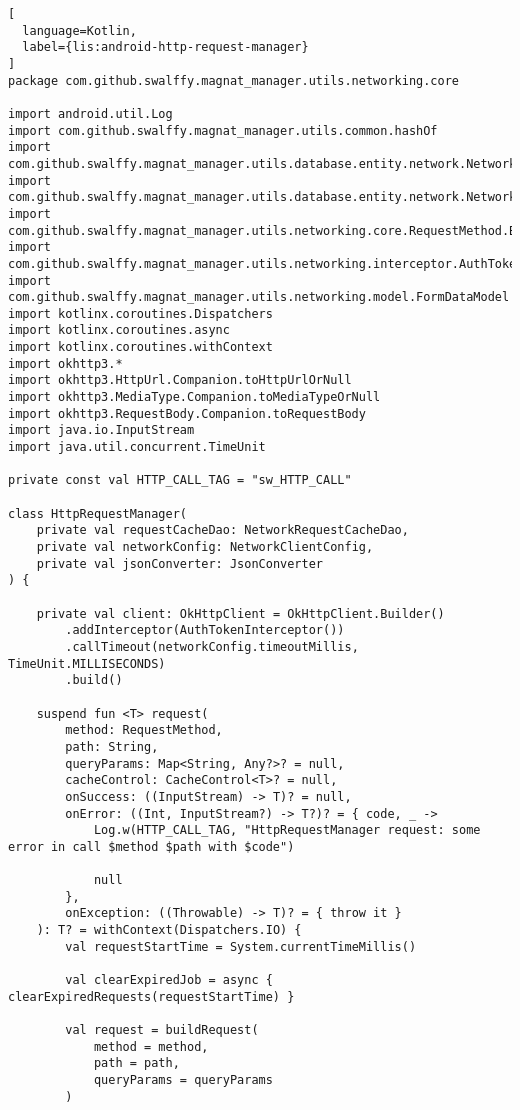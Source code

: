 \begin{lstlisting}[
  language=Kotlin,
  label={lis:android-http-request-manager}
]
package com.github.swalffy.magnat_manager.utils.networking.core

import android.util.Log
import com.github.swalffy.magnat_manager.utils.common.hashOf
import com.github.swalffy.magnat_manager.utils.database.entity.network.NetworkRequestCacheDao
import com.github.swalffy.magnat_manager.utils.database.entity.network.NetworkRequestCacheRecord
import com.github.swalffy.magnat_manager.utils.networking.core.RequestMethod.BodyType
import com.github.swalffy.magnat_manager.utils.networking.interceptor.AuthTokenInterceptor
import com.github.swalffy.magnat_manager.utils.networking.model.FormDataModel
import kotlinx.coroutines.Dispatchers
import kotlinx.coroutines.async
import kotlinx.coroutines.withContext
import okhttp3.*
import okhttp3.HttpUrl.Companion.toHttpUrlOrNull
import okhttp3.MediaType.Companion.toMediaTypeOrNull
import okhttp3.RequestBody.Companion.toRequestBody
import java.io.InputStream
import java.util.concurrent.TimeUnit

private const val HTTP_CALL_TAG = "sw_HTTP_CALL"

class HttpRequestManager(
    private val requestCacheDao: NetworkRequestCacheDao,
    private val networkConfig: NetworkClientConfig,
    private val jsonConverter: JsonConverter
) {

    private val client: OkHttpClient = OkHttpClient.Builder()
        .addInterceptor(AuthTokenInterceptor())
        .callTimeout(networkConfig.timeoutMillis, TimeUnit.MILLISECONDS)
        .build()

    suspend fun <T> request(
        method: RequestMethod,
        path: String,
        queryParams: Map<String, Any?>? = null,
        cacheControl: CacheControl<T>? = null,
        onSuccess: ((InputStream) -> T)? = null,
        onError: ((Int, InputStream?) -> T?)? = { code, _ ->
            Log.w(HTTP_CALL_TAG, "HttpRequestManager request: some error in call $method $path with $code")

            null
        },
        onException: ((Throwable) -> T)? = { throw it }
    ): T? = withContext(Dispatchers.IO) {
        val requestStartTime = System.currentTimeMillis()

        val clearExpiredJob = async { clearExpiredRequests(requestStartTime) }

        val request = buildRequest(
            method = method,
            path = path,
            queryParams = queryParams
        )


\end{lstlisting}

